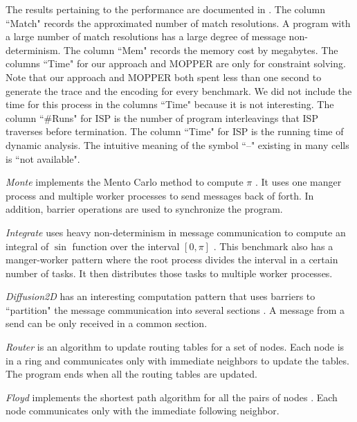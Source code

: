 The results pertaining to the performance are documented in . The column ``Match" records the approximated number of match resolutions. A program with a large number of match resolutions has a large degree of message non-determinism. The column ``Mem" records the memory cost by megabytes. The columns ``Time" for our approach and MOPPER are only for constraint solving. Note that our approach and MOPPER both spent less than one second to generate the trace and the encoding for every benchmark. We did not include the time for this process in the columns ``Time" because it is not interesting. The column ``\#Runs" for ISP is the number of program interleavings that ISP traverses before termination. The column ``Time" for ISP is the running time of dynamic analysis. The intuitive meaning of the symbol ``--" existing in many cells is ``not available".
 

\textit{Monte} implements the Mento Carlo method to compute $\pi$ \cite{benchmark:mentoCarlo}. It uses one manger process and multiple worker processes to send messages back of forth. In addition, barrier operations are used to synchronize the program. 

\textit{Integrate} uses heavy non-determinism in message communication to compute an integral of $\sin$ function over the interval $[0, \pi]$ \cite{benchmark:fevs}. This benchmark also has a manger-worker pattern where the root process divides the interval in a certain number of tasks. It then distributes those tasks to multiple worker processes.
 
\textit{Diffusion2D} has an interesting computation pattern that uses barriers to ``partition" the message communication into several sections \cite{benchmark:fevs}. A message from a send can be only received in a common section. 

\textit{Router} is an algorithm to update routing tables for a set of nodes. Each node is in a ring and communicates only with immediate neighbors to update the tables. The program ends when all the routing tables are updated. 

\textit{Floyd} implements the shortest path algorithm for all the pairs of nodes \cite{DBLP:conf/ppopp/XueLWGCZZV09}. Each node communicates only with the immediate following neighbor.

